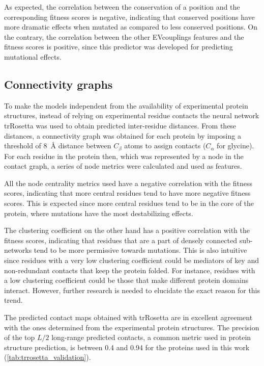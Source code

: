 As expected, the correlation between the conservation of a position and the corresponding fitness scores is negative, indicating that conserved positions have more dramatic effects when mutated as compared to less conserved positions.
On the contrary, the correlation between the other EVcouplings features and the fitness scores is positive, since this predictor was developed for predicting mutational effects.

\subsection{Connectivity graphs}
To make the models independent from the availability of experimental protein structures, instead of relying on experimental residue contacts the neural network trRosetta was used to obtain predicted inter-residue distances.
From these distances, a connectivity graph was obtained for each protein by imposing a threshold of \SI{8}{\angstrom} distance between $C_\beta$ atoms to assign contacts ($C_\alpha$ for glycine).
For each residue in the protein then, which was represented by a node in the contact graph, a series of node metrics were calculated and used as features.

All the node centrality metrics used have a negative correlation with the fitness scores, indicating that more central residues tend to have more negative fitness scores.
This is expected since more central residues tend to be in the core of the protein, where mutations have the most destabilizing effects.

The clustering coefficient on the other hand has a positive correlation with the fitness scores, indicating that residues that are a part of densely connected sub-networks tend to be more permissive towards mutations.
This is also intuitive since residues with a very low clustering coefficient could be mediators of key and non-redundant contacts that keep the protein folded.
For instance, residues with a low clustering coefficient could be those that make different protein domains interact.
However, further research is needed to elucidate the exact reason for this trend.

The predicted contact maps obtained with trRosetta are in excellent agreement with the ones determined from the experimental protein structures.
The precision of the top $L/2$ long-range predicted contacts, a common metric used in protein structure prediction, is between \num{0.4} and \num{0.94} for the proteins used in this work (\autoref{tab:trrosetta_validation}).

